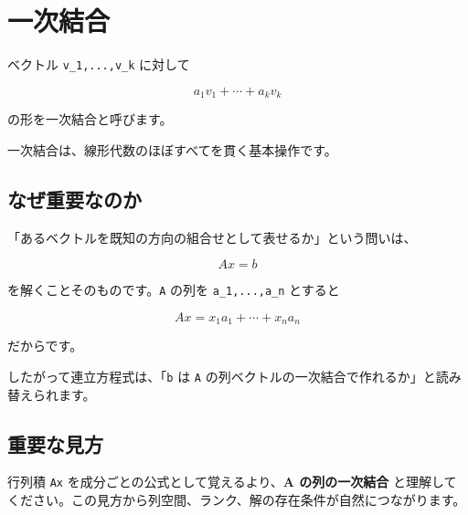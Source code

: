 \documentclass[
  11pt,
  a4paper,
]{ltjsarticle}
\author{}
\date{}
\begin{document}
\hypertarget{ux4e00ux6b21ux7d50ux5408}{%
\section{一次結合}\label{ux4e00ux6b21ux7d50ux5408}}

ベクトル \texttt{v\_1,...,v\_k} に対して

\[
a_1v_1+\cdots+a_kv_k
\]

の形を一次結合と呼びます。

一次結合は、線形代数のほぼすべてを貫く基本操作です。

\hypertarget{ux306aux305cux91cdux8981ux306aux306eux304b}{%
\subsection{なぜ重要なのか}\label{ux306aux305cux91cdux8981ux306aux306eux304b}}

「あるベクトルを既知の方向の組合せとして表せるか」という問いは、

\[
Ax=b
\]

を解くことそのものです。\texttt{A} の列を \texttt{a\_1,...,a\_n}
とすると

\[
Ax=x_1a_1+\cdots+x_na_n
\]

だからです。

したがって連立方程式は、「\texttt{b} は \texttt{A}
の列ベクトルの一次結合で作れるか」と読み替えられます。

\hypertarget{ux91cdux8981ux306aux898bux65b9}{%
\subsection{重要な見方}\label{ux91cdux8981ux306aux898bux65b9}}

行列積 \texttt{Ax} を成分ごとの公式として覚えるより、\textbf{A
の列の一次結合}
と理解してください。この見方から列空間、ランク、解の存在条件が自然につながります。
\end{document}
